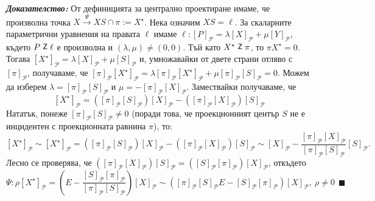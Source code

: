 \documentclass[12pt]{article}
\newcommand{\inc}{\mathrel{\raisebox{0.18ex}{\small$\mathsf{Z}$}}}
\begin{document}
\textit{\textbf{Доказателство:}} От дефиницията за централно проектиране имаме, че произволна точка $X\xrightarrow{\Psi}XS\cap\pi:=X^\star$. Нека означим $XS=\ell$. За скаларните параметрични уравнения на правата $\ell$ имаме $\ell:[P]_{\mathcal P}=\lambda [X]_{\mathcal P}+\mu[Y]_{\mathcal P}$, където $P\inc \ell$ е произволна и $(\lambda,\mu)\neq(0,0)$. Тъй като $X^\star\inc \pi$, то $\pi X^\star=0$. Тогава $[X^\star]_{\mathcal P}=\lambda [X]_{\mathcal P}+\mu [S]_{\mathcal P}$ и, умножавайки от двете страни отляво с $[\pi]_{\mathscr P}$, получаваме, че $[\pi]_{\mathscr P} [X^\star]_{\mathcal P}=\lambda[\pi]_{\mathscr P} [X^\star]_{\mathcal P}+\mu[\pi]_{\mathscr P} [S]_{\mathcal P}=0$. Можем да изберем $\lambda=[\pi]_{\mathscr P} [S]_{\mathcal P}$ и $\mu=-[\pi]_{\mathscr P} [X]_{\mathcal P}$. Замествайки получаваме, че $$[X^\star]_{\mathcal P}=([\pi]_{\mathscr P}[S]_{\mathcal P})[X]_{\mathcal P}-([\pi]_{\mathscr P}[X]_{\mathcal P}) [S]_{\mathcal P}$$ Нататък, понеже $[\pi]_{\mathscr P}[S]_{\mathcal P}\neq 0$ (поради това, че проекционният център $S$ не е инцидентен с проекционната равнина $\pi$), то: $$[X^\star]_{\mathcal P}\sim[X^\star]_{\mathcal P}=([\pi]_{\mathscr P}[S]_{\mathcal P})[X]_{\mathcal P}-([\pi]_{\mathscr P}[X]_{\mathcal P}) [S]_{\mathcal P}\sim [X]_{\mathcal P}-\dfrac{[\pi]_{\mathscr P}[X]_{\mathcal P}}{[\pi]_{\mathscr P}[S]_{\mathcal P}}[S]_{\mathcal P}.$$
Лесно се проверява, че $([\pi]_{\mathscr P} [X]_{\mathcal P})[S]_{\mathcal P}=([S]_{\mathcal P}[\pi]_{\mathscr P})[X]_{\mathcal P}$, откъдето $$\Psi:\rho [X^\star]_{\mathcal P}=\left(E-\dfrac{[S]_{\mathcal P}[\pi]_{\mathscr P}}{[\pi]_{\mathscr P} [S]_{\mathcal P}}\right)[X]_{\mathcal P}\sim \left([\pi]_{\mathscr P} [S]_{\mathcal P}E-[S]_{\mathcal P}[\pi]_{\mathscr P}\right)[X]_{\mathcal P},\ \rho\neq0\ \ \blacksquare$$
\par
\end{document}
